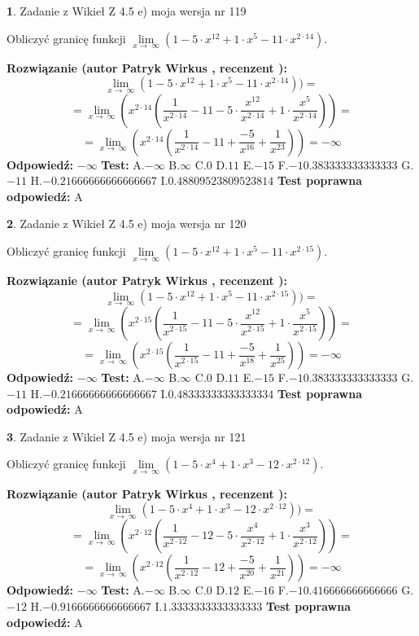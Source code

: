 \documentclass[12pt, a4paper]{article}
\theoremstyle{definition} %
\newtheorem{zad}{}
\newcommand{\zadStart}[1]{\begin{zad}#1\newline}
\newcommand{\zadStop}{\end{zad}}
\newcommand{\rozwStart}[2]{\noindent \textbf{Rozwiązanie (autor #1 , recenzent #2): }\newline}
\newcommand{\rozwStop}{\newline}
\newcommand{\odpStart}{\noindent \textbf{Odpowiedź:}\newline}
\newcommand{\odpStop}{\newline}
\newcommand{\testStart}{\noindent \textbf{Test:}\newline}
\newcommand{\testStop}{\newline}
\newcommand{\kluczStart}{\noindent \textbf{Test poprawna odpowiedź:}\newline}
\newcommand{\kluczStop}{\newline}
\begin{document}
\zadStart{Zadanie z Wikieł Z 4.5 e) moja wersja nr 119}


Obliczyć granicę funkcji  $\lim\limits_{x\to\ \infty}(1 - 5 \cdot x^{12}+1 \cdot x^{5}- 11 \cdot x^{2\cdot14})$.
\zadStop
\rozwStart{Patryk Wirkus}{}
$$\lim\limits_{x\to\ \infty}(1 - 5 \cdot x^{12}+1 \cdot x^{5}- 11 \cdot x^{2\cdot14}))=$$
$$=\lim\limits_{x\to\ \infty}(x^{2\cdot14}(\frac{1}{x^{2\cdot14}}-11 -5 \cdot \frac{x^{12}}{x^{2\cdot14}}+1 \cdot \frac{x^{5}}{x^{2\cdot14}}))=$$
$$=\lim\limits_{x\to\ \infty}(x^{2\cdot14}(\frac{1}{x^{2\cdot14}}-11 + \frac{-5}{x^{16}}+ \frac{1}{x^{23}}))=-\infty$$
\rozwStop
\odpStart
$-\infty$
\odpStop
\testStart
A.$-\infty$ B.$\infty$ C.$0$ D.$11$ E.$-15$
F.$-10.383333333333333$ G.$-11$
H.$-0.21666666666666667$
I.$0.48809523809523814$
\testStop
\kluczStart
A
\kluczStop



\zadStart{Zadanie z Wikieł Z 4.5 e) moja wersja nr 120}


Obliczyć granicę funkcji  $\lim\limits_{x\to\ \infty}(1 - 5 \cdot x^{12}+1 \cdot x^{5}- 11 \cdot x^{2\cdot15})$.
\zadStop
\rozwStart{Patryk Wirkus}{}
$$\lim\limits_{x\to\ \infty}(1 - 5 \cdot x^{12}+1 \cdot x^{5}- 11 \cdot x^{2\cdot15}))=$$
$$=\lim\limits_{x\to\ \infty}(x^{2\cdot15}(\frac{1}{x^{2\cdot15}}-11 -5 \cdot \frac{x^{12}}{x^{2\cdot15}}+1 \cdot \frac{x^{5}}{x^{2\cdot15}}))=$$
$$=\lim\limits_{x\to\ \infty}(x^{2\cdot15}(\frac{1}{x^{2\cdot15}}-11 + \frac{-5}{x^{18}}+ \frac{1}{x^{25}}))=-\infty$$
\rozwStop
\odpStart
$-\infty$
\odpStop
\testStart
A.$-\infty$ B.$\infty$ C.$0$ D.$11$ E.$-15$
F.$-10.383333333333333$ G.$-11$
H.$-0.21666666666666667$
I.$0.48333333333333334$
\testStop
\kluczStart
A
\kluczStop



\zadStart{Zadanie z Wikieł Z 4.5 e) moja wersja nr 121}


Obliczyć granicę funkcji  $\lim\limits_{x\to\ \infty}(1 - 5 \cdot x^{4}+1 \cdot x^{3}- 12 \cdot x^{2\cdot12})$.
\zadStop
\rozwStart{Patryk Wirkus}{}
$$\lim\limits_{x\to\ \infty}(1 - 5 \cdot x^{4}+1 \cdot x^{3}- 12 \cdot x^{2\cdot12}))=$$
$$=\lim\limits_{x\to\ \infty}(x^{2\cdot12}(\frac{1}{x^{2\cdot12}}-12 -5 \cdot \frac{x^{4}}{x^{2\cdot12}}+1 \cdot \frac{x^{3}}{x^{2\cdot12}}))=$$
$$=\lim\limits_{x\to\ \infty}(x^{2\cdot12}(\frac{1}{x^{2\cdot12}}-12 + \frac{-5}{x^{20}}+ \frac{1}{x^{21}}))=-\infty$$
\rozwStop
\odpStart
$-\infty$
\odpStop
\testStart
A.$-\infty$ B.$\infty$ C.$0$ D.$12$ E.$-16$
F.$-10.416666666666666$ G.$-12$
H.$-0.9166666666666667$
I.$1.3333333333333333$
\testStop
\kluczStart
A
\kluczStop
\end{document}

